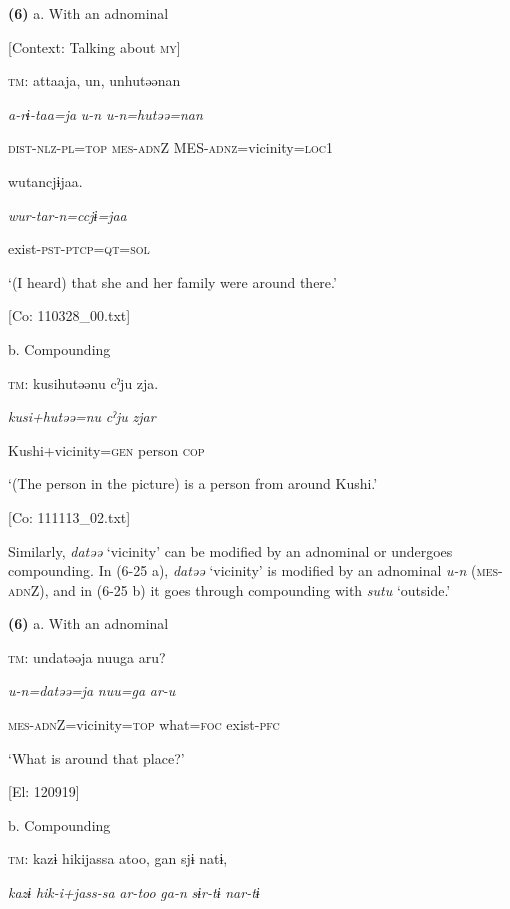 \textbf{(6)}  a.  With an adnominal

    [Context: Talking about \textsc{my}]

    \textsc{tm}:  attaaja,  un,  unhutəənan

      \textit{a-rɨ-taa=ja}  \textit{u-n}  \textit{u-n=hutəə=nan}

      \textsc{dist}-\textsc{nlz}-\textsc{pl}=\textsc{top}  \textsc{mes}-\textsc{adn}Z  MES-\textsc{adnz}=vicinity=\textsc{loc}1

      wutancjɨjaa.

      \textit{wur-tar-n=ccjɨ=jaa}

      exist-\textsc{pst}-\textsc{ptcp}=\textsc{qt}=\textsc{sol}

      ‘(I heard) that she and her family were around there.’

      [Co: 110328\_00.txt]

  b.  Compounding

    \textsc{tm}:  kusihutəənu  cˀju  zja.

      \textit{kusi+hutəə=nu}  \textit{cˀju}  \textit{zjar}

      Kushi+vicinity=\textsc{gen}  person  \textsc{cop}

      ‘(The person in the picture) is a person from around Kushi.’

      [Co: 111113\_02.txt]

Similarly, \textit{datəə} ‘vicinity’ can be modified by an adnominal or undergoes compounding. In (6-25 a), \textit{datəə} ‘vicinity’ is modified by an adnominal \textit{u-n} (\textsc{mes}-\textsc{adn}Z), and in (6-25 b) it goes through compounding with \textit{sutu} ‘outside.’

\textbf{(6)}  a.  With an adnominal

    \textsc{tm}:  undatəəja  nuuga  aru?

      \textit{u-n=datəə=ja}  \textit{nuu=ga}  \textit{ar-u}

      \textsc{mes}-\textsc{adn}Z=vicinity=\textsc{top}  what=\textsc{foc}  exist-\textsc{pfc}

      ‘What is around that place?’

      [El: 120919]

  b.  Compounding

    \textsc{tm}:  kazɨ  hikijassa  atoo,  gan  sjɨ  natɨ,

      \textit{kazɨ}  \textit{hik-i+jass-sa}  \textit{ar-too}  \textit{ga-n}  \textit{sɨr-tɨ}  \textit{nar-tɨ}

